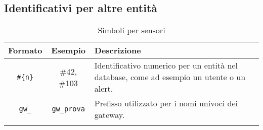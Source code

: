 \subsection{Identificativi per altre entità}

\begin{center}
	\begin{longtable}{|c|c|p{12cm}|}
	\hline
	\rowcolor{lighter-grayer}
	\textbf{Formato} & \textbf{Esempio} & \textbf{Descrizione} \\
	\hline
	\endfirsthead
	
	\verb!#{n}! & \#42, \#103  & Identificativo numerico per un entità nel database, come ad esempio un utente o un alert. \\
	\hline

	\verb!gw_! & \verb!gw_prova!  & Prefisso utilizzato per i nomi univoci dei gateway. \\
	\hline

	\caption{Simboli per sensori}
	\end{longtable}
\end{center}
